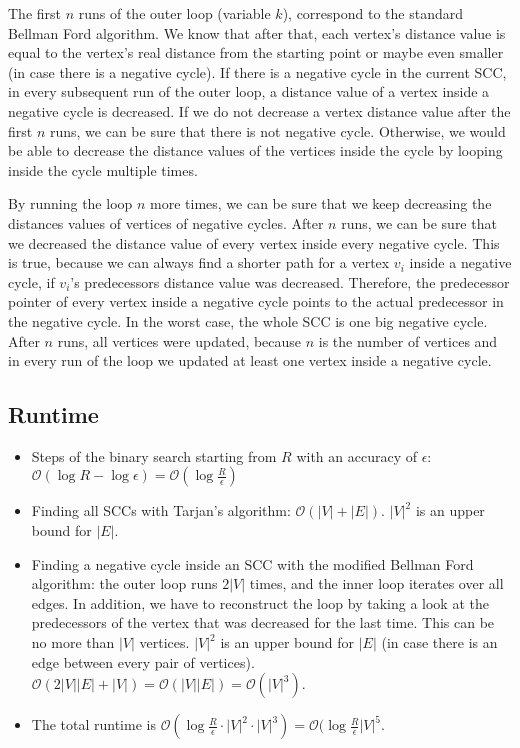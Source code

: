 \documentclass[12pt]{article}
\begin{document}
The first $n$ runs of the outer loop (variable $k$), correspond to the standard Bellman Ford algorithm. We know that after that, each vertex's distance value is equal to the vertex's real distance from the starting point or maybe even smaller (in case there is a negative cycle). If there is a negative cycle in the current SCC, in every subsequent run of the outer loop, a distance value of a vertex inside a negative cycle is decreased. If we do not decrease a vertex distance value after the first $n$ runs, we can be sure that there is not negative cycle. Otherwise, we would be able to decrease the distance values of the vertices inside the cycle by looping inside the cycle multiple times.

By running the loop $n$ more times, we can be sure that we keep decreasing the distances values of vertices of negative cycles. After $n$ runs, we can be sure that we decreased the distance value of every vertex inside every negative cycle. This is true, because we can always find a shorter path for a vertex $v_i$ inside a negative cycle, if $v_i$'s predecessors distance value was decreased. Therefore, the predecessor pointer of every vertex inside a negative cycle points to the actual predecessor in the negative cycle. In the worst case, the whole SCC is one big negative cycle. After $n$ runs, all vertices were updated, because $n$ is the number of vertices and in every run of the loop we updated at least one vertex inside a negative cycle.

\subsection*{Runtime}
\begin{itemize}
	\item Steps of the binary search starting from $R$ with an accuracy of $\epsilon$: $\mathcal{O}(\log R - \log \epsilon) = \mathcal{O}(\log \frac{R}{\epsilon})$
	\item Finding all SCCs with Tarjan's algorithm: $\mathcal{O}(|V| + |E|)$. $|V|^2$ is an upper bound for $|E|$.
	\item Finding a negative cycle inside an SCC with the modified Bellman Ford algorithm: the outer loop runs $2|V|$ times, and the inner loop iterates over all edges. In addition, we have to reconstruct the loop by taking a look at the predecessors of the vertex that was decreased for the last time. This can be no more than $|V|$ vertices. $|V|^2$ is an upper bound for $|E|$ (in case there is an edge between every pair of vertices). $\mathcal{O}(2|V| |E| + |V|) = \mathcal{O}(|V| |E|) = \mathcal{O}(|V|^3)$.
	\item The total runtime is $\mathcal{O}(\log \frac{R}{\epsilon} \cdot |V|^2 \cdot |V|^3) = \mathcal{O}(\log \frac{R}{\epsilon} |V|^5$.
\end{itemize}
\end{document}
